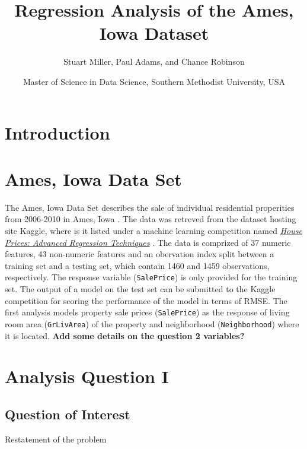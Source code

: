 \documentclass[american,]{article}
\title{Regression Analysis of the Ames, Iowa Dataset}
\author{Stuart Miller, Paul Adams, and Chance Robinson}
\date{Master of Science in Data Science, Southern Methodist University, USA}
\begin{document}
\maketitle

\hypertarget{introduction}{%
\section{Introduction}\label{introduction}}

\citet{Sleuth}

\hypertarget{ames-iowa-data-set}{%
\section{Ames, Iowa Data Set}\label{ames-iowa-data-set}}

The Ames, Iowa Data Set describes the sale of individual residential
properities from 2006-2010 in Ames, Iowa \cite{Cock}. The data was
retreved from the dataset hosting site Kaggle, where is it listed under
a machine learning competition named
\href{https://www.kaggle.com/c/house-prices-advanced-regression-techniques/overview}{\textit{House Prices: Advanced Regression Techniques}}
\cite{Kaggle2016}. The data is comprized of 37 numeric features, 43
non-numeric features and an obervation index split between a training
set and a testing set, which contain 1460 and 1459 observations,
respectively. The response variable (\texttt{SalePrice}) is only
provided for the training set. The output of a model on the test set can
be submitted to the Kaggle competition for scoring the performance of
the model in terms of RMSE. The first analysis models property sale
prices (\texttt{SalePrice}) as the response of living room area
(\texttt{GrLivArea}) of the property and neighborhood
(\texttt{Neighborhood}) where it is located. \textbf{Add some details on
the question 2 variables?}

\hypertarget{analysis-question-i}{%
\section{Analysis Question I}\label{analysis-question-i}}

\hypertarget{question-of-interest}{%
\subsection{Question of Interest}\label{question-of-interest}}

Restatement of the problem
\end{document}
